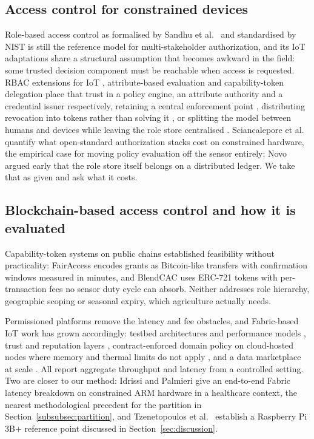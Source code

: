 \documentclass[a4paper,fleqn]{cas-sc}
\begin{document}
\subsection{Access control for constrained devices}
\label{subsec:rw_models}

Role-based access control as formalised by Sandhu et al.\ \cite{sandhu1996role}
and standardised by NIST \cite{ferraiolo2001role} is still the reference
model for multi-stakeholder authorization, and its IoT adaptations share a
structural assumption that becomes awkward in the field: some trusted
decision component must be reachable when access is requested. RBAC
extensions for IoT \cite{ye2015iot}, attribute-based evaluation
\cite{hu2014guide,servos2017abac,sciancalepore2017oauth} and capability-token
delegation \cite{hernandez2017capability} place that trust in a policy
engine, an attribute authority and a credential issuer respectively,
retaining a central enforcement point \cite{ye2015iot,servos2017abac},
distributing revocation into tokens rather than solving it
\cite{hernandez2017capability}, or splitting the model between humans and
devices while leaving the role store centralised
\cite{alshehri2016access}. Sciancalepore et
al.\ \cite{sciancalepore2017oauth} quantify what open-standard authorization
stacks cost on constrained hardware, the empirical case for moving policy
evaluation off the sensor entirely; Novo \cite{novo2018blockchain} argued
early that the role store itself belongs on a distributed ledger. We take
that as given and ask what it costs.

\subsection{Blockchain-based access control and how it is evaluated}
\label{subsec:rw_blockchain}

Capability-token systems on public chains established feasibility without
practicality: FairAccess \cite{ouaddah2016fairaccess} encodes grants as
Bitcoin-like transfers with confirmation windows measured in minutes, and
BlendCAC \cite{xu2018blendcac} uses ERC-721 tokens with per-transaction fees
no sensor duty cycle can absorb. Neither addresses role hierarchy,
geographic scoping or seasonal expiry, which agriculture actually needs.

Permissioned platforms remove the latency and fee obstacles, and Fabric-based
IoT work has grown accordingly: testbed architectures and performance models
\cite{shih2022iiot,pajooh2022fabric_iot,kepark2023fabric_model}, trust and
reputation layers \cite{putra2021trust}, contract-enforced domain policy on
cloud-hosted nodes where memory and thermal limits do not apply
\cite{usman2024blockchain}, and a data marketplace at scale
\cite{gonzalez2023marketplace}. All report aggregate throughput and latency
from a controlled setting. Two are closer to our method: Idrissi and
Palmieri \cite{idrissi2024blockchain_jsupercomput} give an end-to-end Fabric
latency breakdown on constrained ARM hardware in a healthcare context, the
nearest methodological precedent for the partition in
Section~\ref{subsubsec:partition}, and Tzenetopoulos et
al.\ \cite{tzenetopoulos2022hlfkubed} establish a Raspberry Pi 3B+ reference
point discussed in Section~\ref{sec:discussion}.
\end{document}
